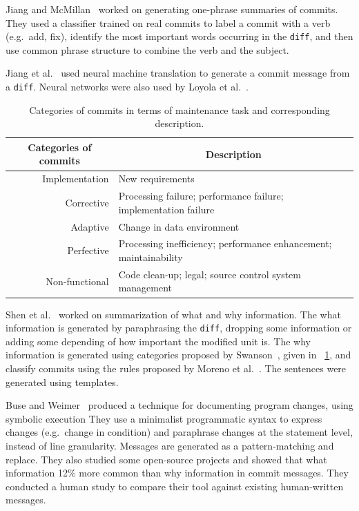 \documentclass[11pt]{sdm_internship}
\theoremstyle{definition}
\begin{document}
Jiang and McMillan~\cite{jiang2017towards} worked on generating one-phrase summaries of commits.
They used a classifier trained on real commits to label a commit with a verb (e.g.\ add, fix), identify the most important words occurring in the \texttt{diff}, and then use common phrase structure to combine the verb and the subject.

Jiang et al.~\cite{jiang2017automatically} used neural machine translation to generate a commit message from a \texttt{diff}.
Neural networks were also used by Loyola et al.~\cite{loyola2017neural}.

\begin{table}
  \centering
  \begin{tabular}{rl}
    \toprule
    \multicolumn{1}{c}{\textbf{Categories of commits}} & \multicolumn{1}{c}{\textbf{Description}} \\
    \midrule
    Implementation & New requirements \\
    Corrective & Processing failure; performance failure; implementation failure \\
    Adaptive & Change in data environment \\
    Perfective & Processing inefficiency; performance enhancement; maintainability \\
    Non-functional & Code clean-up; legal; source control system management \\
    \bottomrule
  \end{tabular}
  \caption{Categories of commits in terms of maintenance task and corresponding description.}%
  \label{tab:commit_categories}
\end{table}

Shen et al.~\cite{shen2016automatic} worked on summarization of what and why information.
The what information is generated by paraphrasing the \texttt{diff}, dropping some information or adding some depending of how important the modified unit is.
The why information is generated using categories proposed by Swanson~\cite{swanson1976dimensions}, given in \tablename~\ref{tab:commit_categories}, and classify commits using the rules proposed by Moreno et al.~\cite{moreno2012jstereocode}.
The sentences were generated using templates.

Buse and Weimer~\cite{buse2010automatically} produced a technique for documenting program changes, using symbolic execution
They use a minimalist programmatic syntax to express changes (e.g.\ change in condition) and paraphrase changes at the statement level, instead of line granularity.
Messages are generated as a pattern-matching and replace.
They also studied some open-source projects and showed that what information 12\% more common than why information in commit messages.
They conducted a human study to compare their tool against existing human-written messages.
\end{document}
